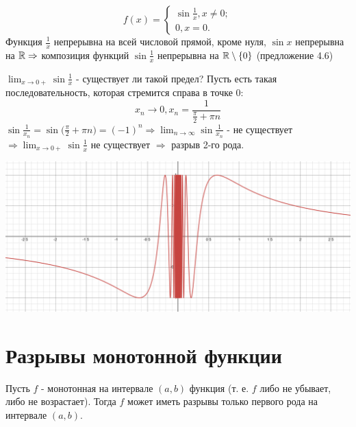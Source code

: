 	\begin{explanation}
		\begin{equation*}
			f(x) = \begin{cases}
				\sin{\frac{1}{x}}, x \neq 0; \\
				0, x = 0.
			\end{cases}
		\end{equation*}
		Функция $\frac{1}{x}$ непрерывна на всей числовой прямой, кроме нуля, $\sin{x}$ непрерывна на $\mathbb R \Rightarrow$ композиция функций $\sin{\frac{1}{x}}$ непрерывна на $\mathbb R \setminus \{0\}$ (предложение 4.6)
		
		$\lim_{x \to 0+} \sin{\frac{1}{x}}$ - существует ли такой предел? Пусть есть такая последовательность, которая стремится справа в точке $0$:
		\[ x_n \to 0, x_n = \frac{1}{\frac{\pi}{2} + \pi n} \]
		$\sin{\frac{1}{x_n}} = \sin{\big(\frac{\pi}{2} + \pi n\big)} = (-1)^n \Rightarrow \lim_{n \to \infty} \sin{\frac{1}{x_n}}$ - не существует $\Rightarrow \lim_{x \to 0+} \sin{\frac{1}{x}}$ не существует $\Rightarrow$ разрыв 2-го рода.
		\begin{center}
			\includegraphics[width=\textwidth]{img/lecture13/graph_of_sin}
		\end{center}
	\end{explanation}
	
	\section{Разрывы монотонной функции}
	
	\begin{sentence}
		Пусть $f$ - монотонная на интервале $(a, b)$ функция (т. е. $f$ либо не убывает, либо не возрастает). Тогда $f$ может иметь разрывы только первого рода на интервале $(a, b)$.
	\end{sentence}
	
